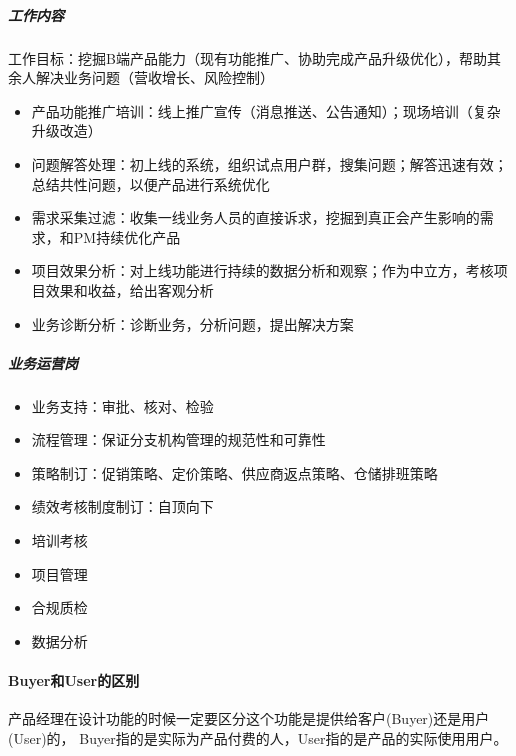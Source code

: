 \documentclass[letterpaper,10pt,english]{sphinxmanual}
\begin{document}
\subparagraph{工作内容}
\label{\detokenize{chapter_introduction/2B:id27}}
工作目标：挖掘B端产品能力（现有功能推广、协助完成产品升级优化），帮助其余人解决业务问题（营收增长、风险控制）
\begin{itemize}
\item {} 
产品功能推广培训：线上推广宣传（消息推送、公告通知）；现场培训（复杂升级改造）

\item {} 
问题解答处理：初上线的系统，组织试点用户群，搜集问题；解答迅速有效；总结共性问题，以便产品进行系统优化

\item {} 
需求采集过滤：收集一线业务人员的直接诉求，挖掘到真正会产生影响的需求，和PM持续优化产品

\item {} 
项目效果分析：对上线功能进行持续的数据分析和观察；作为中立方，考核项目效果和收益，给出客观分析

\item {} 
业务诊断分析：诊断业务，分析问题，提出解决方案

\end{itemize}


\subparagraph{业务运营岗}
\label{\detokenize{chapter_introduction/2B:id28}}\begin{itemize}
\item {} 
业务支持：审批、核对、检验

\item {} 
流程管理：保证分支机构管理的规范性和可靠性

\item {} 
策略制订：促销策略、定价策略、供应商返点策略、仓储排班策略

\item {} 
绩效考核制度制订：自顶向下

\item {} 
培训考核

\item {} 
项目管理

\item {} 
合规质检

\item {} 
数据分析

\end{itemize}


\paragraph{Buyer和User的区别}
\label{\detokenize{chapter_introduction/2B:buyeruser}}
产品经理在设计功能的时候一定要区分这个功能是提供给客户(Buyer)还是用户(User)的，
Buyer指的是实际为产品付费的人，User指的是产品的实际使用用户。
\end{document}
